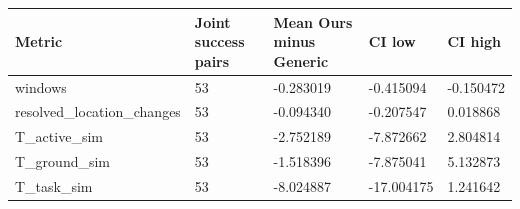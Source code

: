 \begin{tabular}{lllll}
\hline
Metric & Joint success pairs & Mean Ours minus Generic & CI low & CI high \\
\hline
windows & 53 & -0.283019 & -0.415094 & -0.150472 \\
resolved\_location\_changes & 53 & -0.094340 & -0.207547 & 0.018868 \\
T\_active\_sim & 53 & -2.752189 & -7.872662 & 2.804814 \\
T\_ground\_sim & 53 & -1.518396 & -7.875041 & 5.132873 \\
T\_task\_sim & 53 & -8.024887 & -17.004175 & 1.241642 \\
\hline
\end{tabular}
